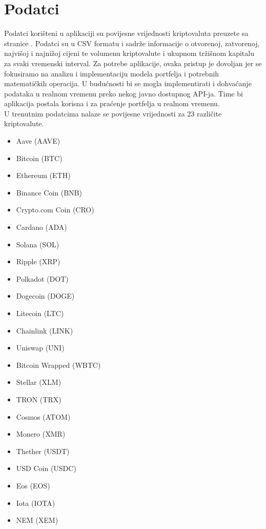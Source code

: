 \documentclass[zavrsnirad]{fer}
\begin{document}
\section{Podatci}
\label{sek:podaci}
Podatci korišteni u aplikaciji su povijesne vrijednosti
kriptovaluta preuzete sa stranice \cite{kaggledataset}.
Podatci su u CSV formatu i sadrže informacije o otvorenoj, zatvorenoj,
najvišoj i najnižoj cijeni te volumenu kriptovalute i ukupnom tržišnom
kapitalu za svaki vremenski interval. Za potrebe aplikacije,
ovaka pristup je dovoljan jer se fokusiramo na analizu i
implementaciju modela portfelja i potrebnih matematičkih operacija.
U budućnosti bi se mogla implementirati i dohvaćanje podataka
u realnom vremenu preko nekog javno dostupnog API-ja. Time bi
aplikacija postala korisna i za praćenje portfelja u realnom vremenu.\\
U trenutnim podatcima nalaze se povijesne vrijednosti za 23 različite kriptovalute.
\begin{itemize}
    \item Aave (AAVE)
    \item Bitcoin (BTC)
    \item Ethereum (ETH)
    \item Binance Coin (BNB)
    \item Crypto.com Coin (CRO)
    \item Cardano (ADA)
    \item Solana (SOL)
    \item Ripple (XRP)
    \item Polkadot (DOT)
    \item Dogecoin (DOGE)
    \item Litecoin (LTC)
    \item Chainlink (LINK)
    \item Uniswap (UNI)
    \item Bitcoin Wrapped (WBTC)
    \item Stellar (XLM)
    \item TRON (TRX)
    \item Cosmos (ATOM)
    \item Monero (XMR)
    \item Thether (USDT)
    \item USD Coin (USDC)
    \item Eos (EOS)
    \item Iota (IOTA)
    \item NEM (XEM)
\end{itemize}


\end{document}
